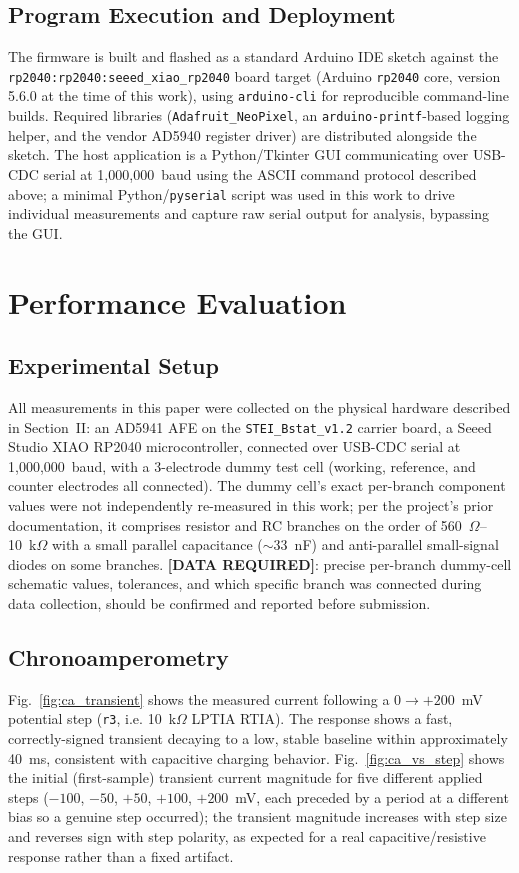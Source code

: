 \documentclass[journal]{IEEEtran}
\begin{document}
\subsection{Program Execution and Deployment}
The firmware is built and flashed as a standard Arduino IDE sketch against the \texttt{rp2040:rp2040:seeed\_xiao\_rp2040} board target (Arduino \texttt{rp2040} core, version 5.6.0 at the time of this work), using \texttt{arduino-cli} for reproducible command-line builds. Required libraries (\texttt{Adafruit\_NeoPixel}, an \texttt{arduino-printf}-based logging helper, and the vendor AD5940 register driver) are distributed alongside the sketch. The host application is a Python/Tkinter GUI communicating over USB-CDC serial at 1{,}000{,}000~baud using the ASCII command protocol described above; a minimal Python/\texttt{pyserial} script was used in this work to drive individual measurements and capture raw serial output for analysis, bypassing the GUI.

\section{Performance Evaluation}

\subsection{Experimental Setup}
All measurements in this paper were collected on the physical hardware described in Section~II: an AD5941 AFE on the \texttt{STEI\_Bstat\_v1.2} carrier board, a Seeed Studio XIAO RP2040 microcontroller, connected over USB-CDC serial at 1{,}000{,}000~baud, with a 3-electrode dummy test cell (working, reference, and counter electrodes all connected). The dummy cell's exact per-branch component values were not independently re-measured in this work; per the project's prior documentation, it comprises resistor and RC branches on the order of 560~$\Omega$--10~k$\Omega$ with a small parallel capacitance ($\sim$33~nF) and anti-parallel small-signal diodes on some branches. \textbf{[DATA REQUIRED]}: precise per-branch dummy-cell schematic values, tolerances, and which specific branch was connected during data collection, should be confirmed and reported before submission.

\subsection{Chronoamperometry}
Fig.~\ref{fig:ca_transient} shows the measured current following a $0\rightarrow+200$~mV potential step (\texttt{r3}, i.e. 10~k$\Omega$ LPTIA RTIA). The response shows a fast, correctly-signed transient decaying to a low, stable baseline within approximately 40~ms, consistent with capacitive charging behavior. Fig.~\ref{fig:ca_vs_step} shows the initial (first-sample) transient current magnitude for five different applied steps ($-100$, $-50$, $+50$, $+100$, $+200$~mV, each preceded by a period at a different bias so a genuine step occurred); the transient magnitude increases with step size and reverses sign with step polarity, as expected for a real capacitive/resistive response rather than a fixed artifact.
\end{document}
